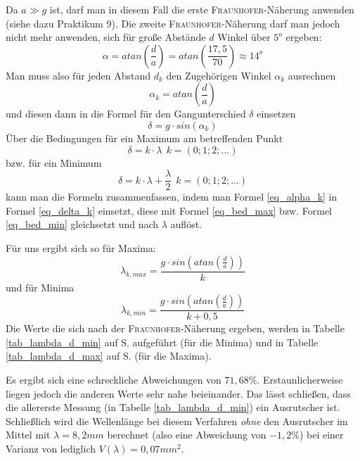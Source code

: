 Da \(a \gg g\) ist, darf man in diesem Fall die erste \textsc{Fraunhofer}-Näherung anwenden (siehe dazu Praktikum 9). Die zweite \textsc{Fraunhofer}-Näherung darf man jedoch nicht mehr anwenden, sich für große Abstände \(d\) Winkel über \(5^o\) ergeben:
\[
   \alpha = atan \left ( \frac{d}{a} \right ) = atan \left ( \frac{17,5}{70} \right ) \approx 14^o
\]
Man muss also für jeden Abstand \(d_k\) den Zugehörigen Winkel \(\alpha_k\) ausrechnen
\begin{equation}
   \alpha_k = atan \left ( \frac{d}{a} \right )
   \label{eq_alpha_k}
\end{equation}
und diesen dann in die Formel für den Gangunterschied \(\delta\) einsetzen
\begin{equation}
   \delta = g \cdot sin ( \alpha_k )
   \label{eq_delta_k}
\end{equation}
Über die Bedingungen für ein Maximum am betreffenden Punkt
\begin{equation}
   \delta = k \cdot \lambda ~~ k = (0; 1; 2; ...)
   \label{eq_bed_max}
\end{equation}
bzw. für ein Minimum
\begin{equation}
   \delta = k \cdot \lambda + \frac{\lambda}{2}~~ k = (0; 1; 2; ...)
   \label{eq_bed_min}
\end{equation}
kann man die Formeln zusammenfassen, indem man Formel \ref{eq_alpha_k} in Formel \ref{eq_delta_k} einsetzt, diese mit Formel \ref{eq_bed_max} bzw. Formel \ref{eq_bed_min} gleichsetzt und nach \(\lambda\) auflöst.

Für uns ergibt sich so für Maxima:
\begin{equation}
   \lambda_{k, max} = \frac{g \cdot sin \left ( atan \left ( \frac{d}{a} \right ) \right )}{k}
\end{equation}
und für Minima
\begin{equation}
   \lambda_{k, min} = \frac{g \cdot sin \left ( atan \left ( \frac{d}{a} \right ) \right )}{k + 0,5}
\end{equation}
Die Werte die sich nach der \textsc{Fraunhofer}-Näherung ergeben, werden in Tabelle \ref{tab_lambda_d_min} auf S. \pageref{tab_lambda_d_min} aufgeführt (für die Minima) und in Tabelle \ref{tab_lambda_d_max} auf S. \pageref{tab_lambda_d_max} (für die Maxima). 

Es ergibt sich eine schreckliche Abweichungen von \(71,68\%\). Erstaunlicherweise liegen jedoch die anderen Werte sehr nahe beieinander. Das lässt schließen, dass die allererste Messung (in Tabelle \ref{tab_lambda_d_min}) ein Ausrutscher ist. Schließlich wird die Wellenlänge bei diesem Verfahren \emph{ohne} den Ausrutscher im Mittel mit \(\lambda = 8,2mm\) berechnet (also eine Abweichung von \(-1,2\%\)) bei einer Varianz von lediglich \(V(\lambda) = 0,07mm^2\).

